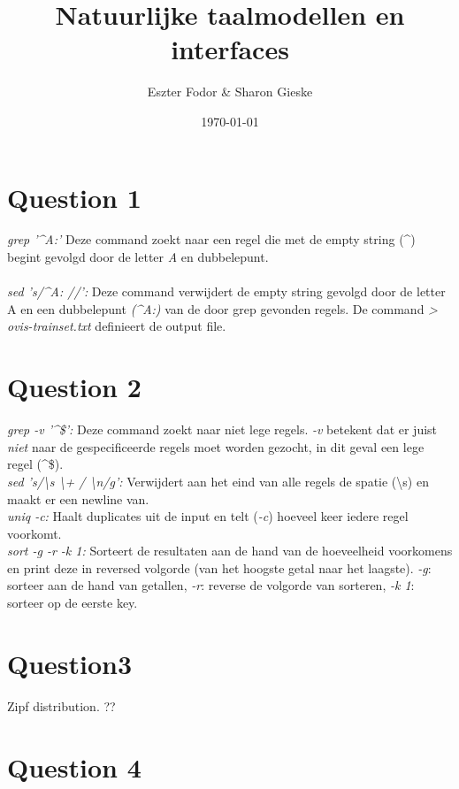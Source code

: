 \documentclass[a4paper,11pt]{article}
\begin{document}
\title{Natuurlijke taalmodellen en interfaces}
\author{Eszter Fodor \& Sharon Gieske}
\date{\today}
\maketitle

\section*{Question 1}
\textit{grep '\^{}A:'} Deze command zoekt naar een regel die met de empty string (\^{}) begint gevolgd door de letter \textit{A} en dubbelepunt.\\\\
\textit{sed 's/\^{}A: //':} Deze command verwijdert de empty string gevolgd door de letter A en een dubbelepunt \textit{(\^{}A:)} van de door grep gevonden regels. De command \textit{> ovis-trainset.txt} definieert de output file.

\section*{Question 2}
\textit{grep -v '\^{}\$':} Deze command zoekt naar niet lege regels. \textit{-v} betekent dat er juist \textit{niet} naar de gespecificeerde regels moet worden gezocht, in dit geval een lege regel (\^{}\$).\\
\textit{sed 's/\textbackslash s \textbackslash + / \textbackslash n/g':} Verwijdert aan het eind van alle regels de spatie (\textbackslash s) en maakt er een newline van. \\
\textit{uniq -c:} Haalt duplicates uit de input en telt (\textit{-c}) hoeveel keer iedere regel voorkomt. \\
\textit{sort -g -r -k 1:} Sorteert de resultaten aan de hand van de hoeveelheid voorkomens en print deze in reversed volgorde (van het hoogste getal naar het laagste). \textit{-g}: sorteer aan de hand van getallen, \textit{-r}: reverse de volgorde van sorteren, \textit{-k 1}: sorteer op de eerste key.\\

\section*{Question3}
Zipf distribution. ??

\section*{Question 4}
\end{document}
